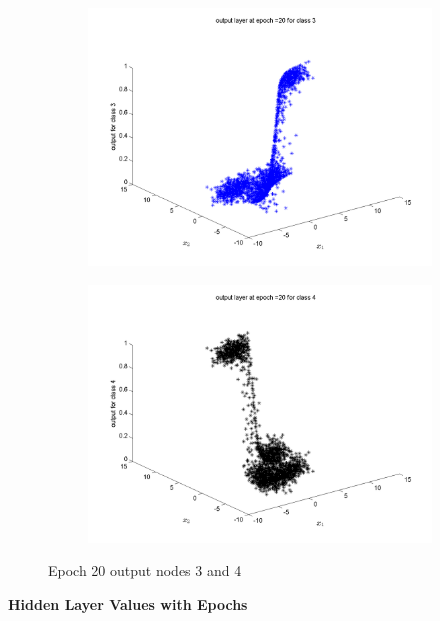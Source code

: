 \documentclass{article}
\begin{document}
\begin{figure}
\begin{subfigure}{.5\textwidth}
  \centering
  \includegraphics[width=.8\linewidth]{Classification/overlapping/20_3}
 
\end{subfigure}%
\begin{subfigure}{.5\textwidth}
  \centering
  \includegraphics[width=.8\linewidth]{Classification/overlapping/20_4}
  \end{subfigure}
\caption{Epoch 20 output nodes 3 and 4}
\end{figure}
\newpage





\textbf{Hidden Layer Values with Epochs \\[10pt]}
\end{document}
